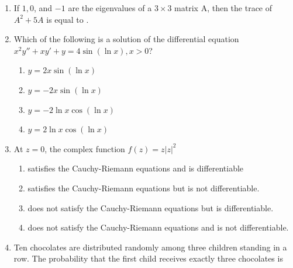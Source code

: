 \documentclass[a4paper,10pt]{article}
\begin{document}
\begin{enumerate}
    \item If $1, 0$, and $-1$ are the eigenvalues of a $3\times3$ matrix A, then the trace of $A^2 + 5A$ is equal to \underline{\hspace{2cm}}.
    
    \hfill{}

    \item Which of the following is a solution of the differential equation $x^2y''+ xy'+ y = 4\sin(\ln x), x > 0$?
    
    \hfill{}
    \begin{enumerate}
        \item $y = 2x \sin(\ln x)$
        \item $y = -2x \sin(\ln x)$
        \item $y = -2\ln x \cos(\ln x)$
        \item $y = 2\ln x \cos(\ln x)$
    \end{enumerate}
    
    \item At $z=0$, the complex function $f(z)=z|z|^2$
    
    \hfill{}
    \begin{enumerate}
        \item satisfies the Cauchy-Riemann equations and is differentiable
        \item satisfies the Cauchy-Riemann equations but is not differentiable.
        \item does not satisfy the Cauchy-Riemann equations but is differentiable.
        \item does not satisfy the Cauchy-Riemann equations and is not differentiable.
    \end{enumerate}
    
    \item Ten chocolates are distributed randomly among three children standing in a row. The probability that the first child receives exactly three chocolates is
    
    \hfill{}
    \begin{enumerate}
    \end{enumerate}


\end{enumerate}
\end{document}
